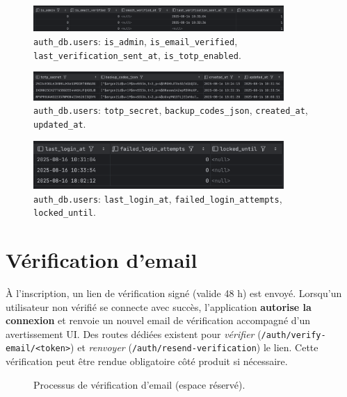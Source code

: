 \begin{figure}[h]
  \centering
  \includegraphics[width=0.85\textwidth]{../figures/chap10/auth_db2.png}
  \caption{\texttt{auth\_db.users}: \texttt{is\_admin}, \texttt{is\_email\_verified}, \texttt{last\_verification\_sent\_at}, \texttt{is\_totp\_enabled}.}
\end{figure}

\begin{figure}[h]
  \centering
  \includegraphics[width=0.85\textwidth]{../figures/chap10/auth_db3.png}
  \caption{\texttt{auth\_db.users}: \texttt{totp\_secret}, \texttt{backup\_codes\_json}, \texttt{created\_at}, \texttt{updated\_at}.}
\end{figure}

\begin{figure}[h]
  \centering
  \includegraphics[width=0.85\textwidth]{../figures/chap10/auth_db4.png}
  \caption{\texttt{auth\_db.users}: \texttt{last\_login\_at}, \texttt{failed\_login\_attempts}, \texttt{locked\_until}.}
\end{figure}

\section{Vérification d'email}
À l'inscription, un lien de vérification signé (valide 48 h) est envoyé. Lorsqu'un utilisateur non vérifié se connecte avec succès, l'application \textbf{autorise la connexion} et renvoie un nouvel email de vérification accompagné d'un avertissement UI. Des routes dédiées existent pour \textit{vérifier} (\texttt{/auth/verify-email/<token>}) et \textit{renvoyer} (\texttt{/auth/resend-verification}) le lien. Cette vérification peut être rendue obligatoire côté produit si nécessaire.

\begin{figure}[h]
  \centering
  \caption{Processus de vérification d'email (espace réservé).}
\end{figure}

